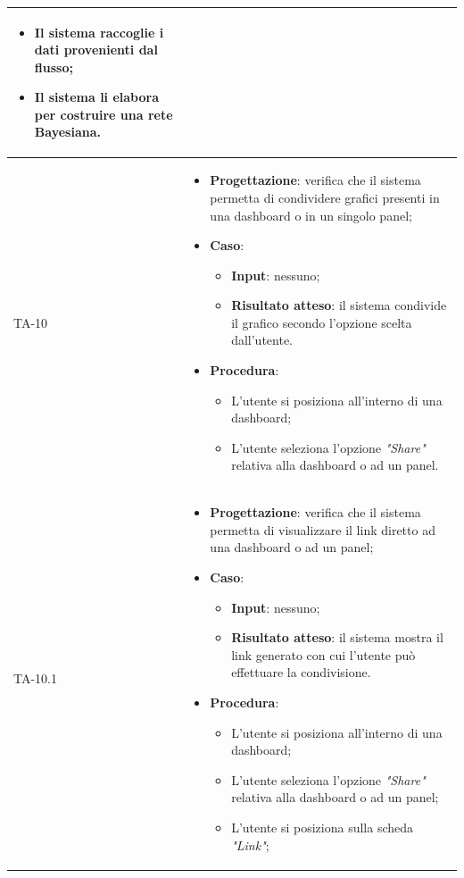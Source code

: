 \begin{longtable}{|C{2.5cm}|C{13cm}|}
\begin{itemize}
\begin{itemize}
		\item Il sistema raccoglie i dati provenienti dal flusso;
		\item Il sistema li elabora per costruire una rete Bayesiana.
	\end{itemize} 
\end{itemize} \\
\hline
{TA-10} &
\begin{itemize}
	\item \textbf{Progettazione}: verifica che il sistema permetta di condividere grafici presenti in una dashboard o in un singolo panel;
	\item \textbf{Caso}: 
	\begin{itemize}
		\item \textbf{Input}: nessuno;
		\item \textbf{Risultato atteso}: il sistema condivide il grafico secondo l'opzione scelta dall'utente.
	\end{itemize}
	\item \textbf{Procedura}:
	\begin{itemize}
		\item L'utente si posiziona all'interno di una dashboard;
		\item L'utente seleziona l'opzione \emph{"Share"} relativa alla dashboard o ad un panel.
	\end{itemize} 
\end{itemize}\\
\hline
{TA-10.1} &
\begin{itemize}
	\item \textbf{Progettazione}: verifica che il sistema permetta di visualizzare il link diretto ad una dashboard o ad un
	panel;
	\item \textbf{Caso}: 
	\begin{itemize}
		\item \textbf{Input}: nessuno;
		\item \textbf{Risultato atteso}: il sistema mostra il link generato con cui l'utente può effettuare la condivisione.
	\end{itemize}
	\item \textbf{Procedura}:
	\begin{itemize}
		\item L'utente si posiziona all'interno di una dashboard;
		\item L'utente seleziona l'opzione \emph{"Share"} relativa alla dashboard o ad un panel;
		\item L'utente si posiziona sulla scheda \emph{"Link"};

\end{itemize}
\end{itemize}
\end{longtable}
